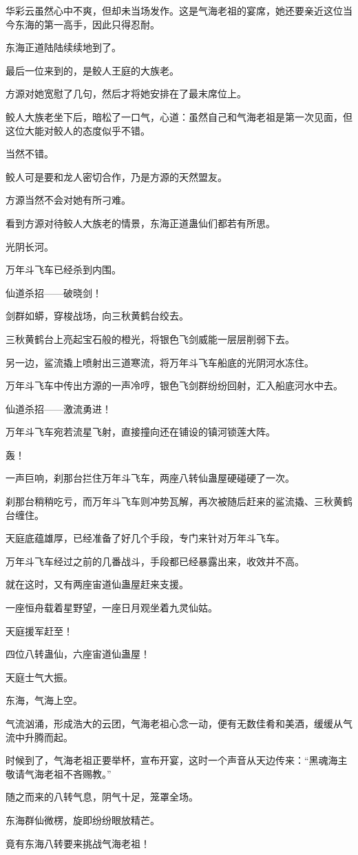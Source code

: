 \begin{this_body}
华彩云虽然心中不爽，但却未当场发作。这是气海老祖的宴席，她还要亲近这位当今东海的第一高手，因此只得忍耐。

东海正道陆陆续续地到了。

最后一位来到的，是鲛人王庭的大族老。

方源对她宽慰了几句，然后才将她安排在了最末席位上。

鲛人大族老坐下后，暗松了一口气，心道：虽然自己和气海老祖是第一次见面，但这位大能对鲛人的态度似乎不错。

当然不错。

鲛人可是要和龙人密切合作，乃是方源的天然盟友。

方源当然不会对她有所刁难。

看到方源对待鲛人大族老的情景，东海正道蛊仙们都若有所思。

光阴长河。

万年斗飞车已经杀到内围。

仙道杀招——破晓剑！

剑群如蟒，穿梭战场，向三秋黄鹤台绞去。

三秋黄鹤台上亮起宝石般的橙光，将银色飞剑威能一层层削弱下去。

另一边，鲨流撬上喷射出三道寒流，将万年斗飞车船底的光阴河水冻住。

万年斗飞车中传出方源的一声冷哼，银色飞剑群纷纷回射，汇入船底河水中去。

仙道杀招——激流勇进！

万年斗飞车宛若流星飞射，直接撞向还在铺设的镇河锁莲大阵。

轰！

一声巨响，刹那台拦住万年斗飞车，两座八转仙蛊屋硬碰硬了一次。

刹那台稍稍吃亏，而万年斗飞车则冲势瓦解，再次被随后赶来的鲨流撬、三秋黄鹤台缠住。

天庭底蕴雄厚，已经准备了好几个手段，专门来针对万年斗飞车。

万年斗飞车经过之前的几番战斗，手段都已经暴露出来，收效并不高。

就在这时，又有两座宙道仙蛊屋赶来支援。

一座恒舟载着星野望，一座日月观坐着九灵仙姑。

天庭援军赶至！

四位八转蛊仙，六座宙道仙蛊屋！

天庭士气大振。

东海，气海上空。

气流汹涌，形成浩大的云团，气海老祖心念一动，便有无数佳肴和美酒，缓缓从气流中升腾而起。

时候到了，气海老祖正要举杯，宣布开宴，这时一个声音从天边传来：“黑魂海主敬请气海老祖不吝赐教。”

随之而来的八转气息，阴气十足，笼罩全场。

东海群仙微楞，旋即纷纷眼放精芒。

竟有东海八转要来挑战气海老祖！

\end{this_body}

